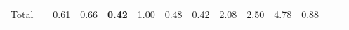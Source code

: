 \begin{tabular}{ll|rrrrrrrrr|rrr}
  \hline
  Total  & &



  


  
  0.61 & 0.66 & \textbf{0.42} & 1.00 & 0.48 & 0.42 & 2.08 & 2.50 & 4.78 & 0.88 &  &  \\


\end{tabular}
